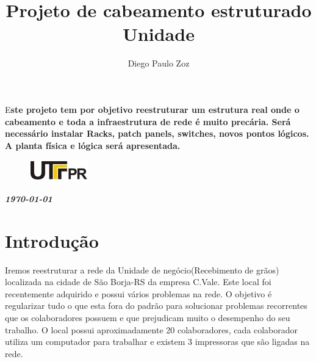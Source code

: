 \documentclass[	DIV=calc,%
							paper=a4,%
							fontsize=12pt,%
							onecolumn]{scrartcl}	 					%
\title{Projeto de cabeamento estruturado Unidade}					%
\author{Diego Paulo Zoz }  	%
\date{}																				%
\newcommand{\initial}[1]{%
     \lettrine[lines=3,lhang=0.3,nindent=0em]{
     				\color{DarkGoldenrod}
     				{\textsf{#1}}}{}}
\begin{document}
\maketitle
\thispagestyle{fancy} 	
\thispagestyle{empty}		%


\initial{E}\textbf{ste projeto tem por objetivo reestruturar um estrutura real onde o cabeamento e toda a infraestrutura de rede é muito precária. Será necessário instalar Racks, patch panels, switches, novos pontos lógicos. A planta física e lógica será apresentada.}

\begin{figure}
	\centering
	\includegraphics{utfpr}
\end{figure}

\vspace{3cm}
\centerline{\textit{\textbf{\today}}}



\clearpage
\renewcommand{\contentsname}{Sumário}
\tableofcontents
\clearpage

\section{Introdução}
Iremos reestruturar a rede da Unidade de negócio(Recebimento de grãos) localizada na cidade de São Borja-RS da empresa C.Vale. Este local foi recentemente adquirido e possui vários problemas na rede. O objetivo é regularizar tudo o que esta fora do padrão para solucionar problemas recorrentes que os colaboradores possuem e que prejudicam muito o desempenho do seu trabalho. O local possui aproximadamente 20 colaboradores, cada colaborador utiliza um computador para trabalhar e existem 3 impressoras que são ligadas na rede. 
\end{document}
